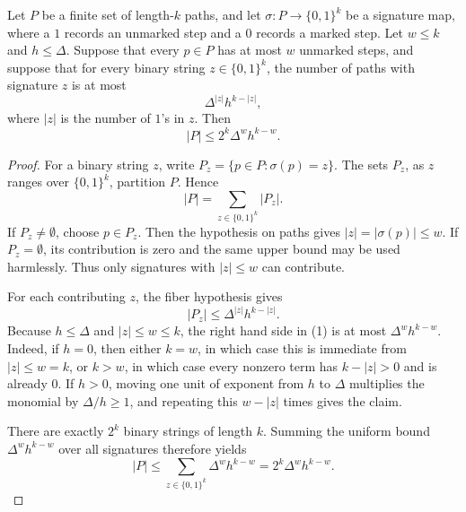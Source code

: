 \begin{lemma}
Let \(P\) be a finite set of length-\(k\) paths, and let
\(\sigma:P\to\{0,1\}^k\) be a signature map, where a \(1\) records an
unmarked step and a \(0\) records a marked step.  Let \(w\le k\) and
\(h\le\Delta\).  Suppose that every \(p\in P\) has at most \(w\) unmarked
steps, and suppose that for every binary string \(z\in\{0,1\}^k\), the number
of paths with signature \(z\) is at most
\[
  \Delta^{|z|}h^{k-|z|},
\]
where \(|z|\) is the number of \(1\)'s in \(z\).  Then
\[
  |P|\le 2^k\Delta^w h^{k-w}.
\]
\end{lemma}
\begin{proof}
For a binary string \(z\), write \(P_z=\{p\in P:\sigma(p)=z\}\).  The sets
\(P_z\), as \(z\) ranges over \(\{0,1\}^k\), partition \(P\).  Hence
\[
  |P|=\sum_{z\in\{0,1\}^k}|P_z|.
\]
If \(P_z\neq\emptyset\), choose \(p\in P_z\).  Then the hypothesis on paths
gives \(|z|=|\sigma(p)|\le w\).  If \(P_z=\emptyset\), its contribution is
zero and the same upper bound may be used harmlessly.  Thus only signatures
with \(|z|\le w\) can contribute.

For each contributing \(z\), the fiber hypothesis gives
\[
  |P_z|\le \Delta^{|z|}h^{k-|z|}. \tag{1}
\]
Because \(h\le\Delta\) and \(|z|\le w\le k\), the right hand side in (1) is
at most \(\Delta^w h^{k-w}\).  Indeed, if \(h=0\), then either \(k=w\), in
which case this is immediate from \(|z|\le w=k\), or \(k>w\), in which case
every nonzero term has \(k-|z|>0\) and is already \(0\).  If \(h>0\), moving
one unit of exponent from \(h\) to \(\Delta\) multiplies the monomial by
\(\Delta/h\ge1\), and repeating this \(w-|z|\) times gives the claim.

There are exactly \(2^k\) binary strings of length \(k\).  Summing the
uniform bound \(\Delta^w h^{k-w}\) over all signatures therefore yields
\[
  |P|
  \le \sum_{z\in\{0,1\}^k}\Delta^w h^{k-w}
  =2^k\Delta^w h^{k-w}.
\]
\end{proof}

